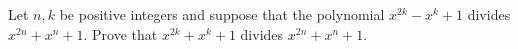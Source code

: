 Let $ n, k$ be positive integers and suppose that the polynomial $ x^{2k}-x^k+1$ divides $ x^{2n}+x^n+1$. Prove that $ x^{2k}+x^k+1$ divides $ x^{2n}+x^n+1$.